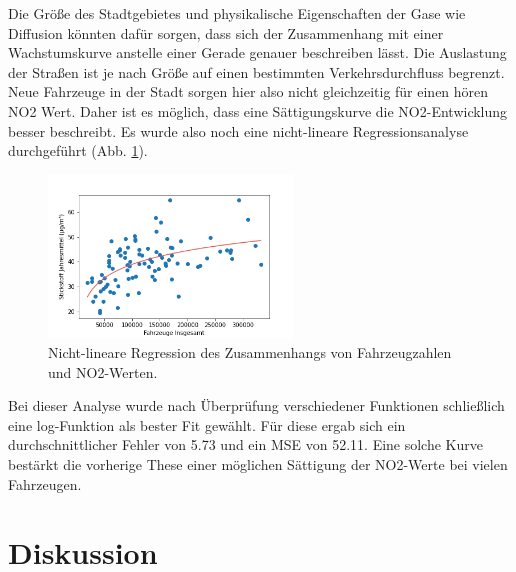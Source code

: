 \documentclass[11pt,a4paper,oneside,german]{article}
\begin{document}
	Die Größe des Stadtgebietes und physikalische Eigenschaften der Gase wie Diffusion könnten dafür sorgen, dass sich der Zusammenhang mit einer Wachstumskurve anstelle einer Gerade genauer beschreiben lässt. Die Auslastung der Straßen ist je nach Größe auf einen bestimmten Verkehrsdurchfluss begrenzt. Neue Fahrzeuge in der Stadt sorgen hier also nicht gleichzeitig für einen hören NO2 Wert. Daher ist es möglich, dass eine Sättigungskurve die NO2-Entwicklung besser beschreibt. Es wurde also noch eine nicht-lineare Regressionsanalyse durchgeführt (Abb. \ref{fig:nonlinreg}).
	
	\begin{figure}[H]
	\centering
	\includegraphics[width=6.5cm]{non_linear_regression_1.png}
	\caption{Nicht-lineare Regression des Zusammenhangs von Fahrzeugzahlen und NO2-Werten.}
	\label{fig:nonlinreg}
	\end{figure}
	
	Bei dieser Analyse wurde nach Überprüfung verschiedener Funktionen schließlich eine log-Funktion als bester Fit gewählt. Für diese ergab sich ein durchschnittlicher Fehler von 5.73 und ein MSE von 52.11. Eine solche Kurve bestärkt die vorherige These einer möglichen Sättigung der NO2-Werte bei vielen Fahrzeugen.

	
	\section{Diskussion}
	
\end{document}
